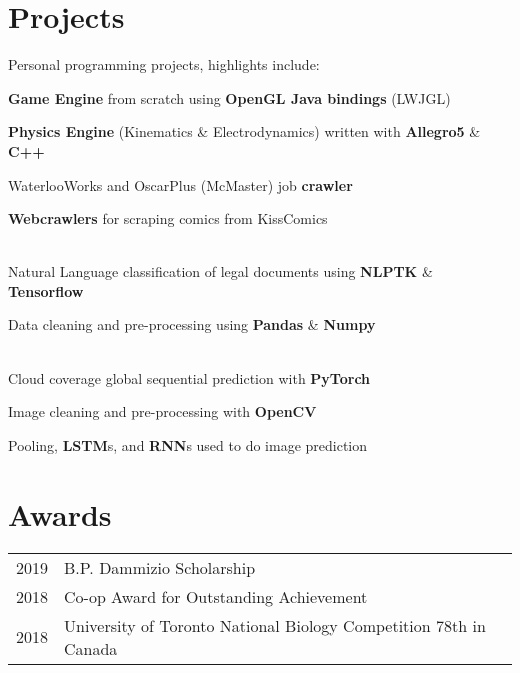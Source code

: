 \documentclass[]{chandan-cv}
\begin{document}
\begin{minipage}[t]{0.71\textwidth}
\section{Projects}
\descript{ }
\location{ } %
Personal programming projects, highlights include:
\begin{tightemize}
	\item \textbf{Game Engine} from scratch using \textbf{OpenGL Java bindings} (LWJGL)
	\item \textbf{Physics Engine} (Kinematics \& Electrodynamics) written with \textbf{Allegro5} \& \textbf{C++}
	\item WaterlooWorks and OscarPlus (McMaster) job \textbf{crawler}
	\item \textbf{Webcrawlers} for scraping comics from KissComics
\end{tightemize}
\sectionsep
{}
\descript{ }
\location{ } %
\\
Natural Language classification of legal documents using \textbf{NLPTK} \& \textbf{Tensorflow}
\begin{tightemize}
	\item Data cleaning and pre-processing using \textbf{Pandas} \& \textbf{Numpy}
\end{tightemize}
\\
Cloud coverage global sequential prediction with \textbf{PyTorch}
\begin{tightemize}
	\item Image cleaning and pre-processing with \textbf{OpenCV}
	\item Pooling, \textbf{LSTM}s, and \textbf{RNN}s used to do image prediction
\end{tightemize}
\sectionsep


\section{Awards}
\begin{tabular}{rll}
2019		&	B.P. Dammizio Scholarship\\
2018		&	Co-op Award for Outstanding Achievement\\
2018		&	University of Toronto National Biology Competition 78th in Canada\\
\end{tabular}
\sectionsep

%
%

\end{minipage}
\end{document}
